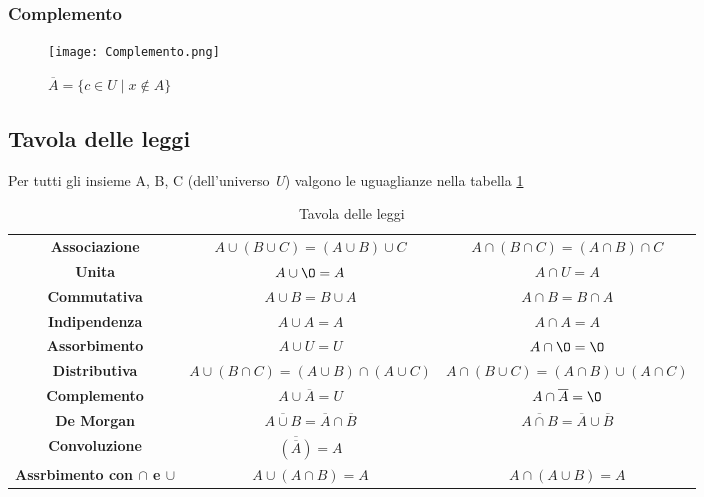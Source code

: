 \subsubsection{Complemento}
\begin{figure}[h!]
    \centering
    \texttt{[image: Complemento.png]}
    \caption{$\overline{A} = \{c \in U \mid x \notin A\}$}
    \label{fig:complemento}
\end{figure}

\subsection{Tavola delle leggi}
Per tutti gli insieme A, B, C (dell'universo \textit{U}) valgono le uguaglianze nella tabella \ref{tab:leggi-insiemi}
\begin{table}[h!]
    \centering
    \setlength{\tabcolsep}{8pt}
    \renewcommand{\arraystretch}{2}
    \begin{tabular}{|c|c c|}
        \hline
        \textbf{Associazione} & $A \cup (B \cup C) = (A \cup B) \cup C$ & $A \cap (B \cap C) = (A \cap B) \cap C$ \\
        \textbf{Unita} & $A \cup \O = A$ & $A \cap U = A$ \\
        \textbf{Commutativa} & $A \cup B = B \cup A$ & $A \cap B = B \cap A$ \\
        \textbf{Indipendenza} & $A \cup A = A$ & $A \cap A = A$ \\
        \textbf{Assorbimento} & $A \cup U = U$ & $A \cap \O = \O$ \\
        \textbf{Distributiva} & $A \cup (B \cap C) = (A \cup B) \cap (A \cup C)$ & $A \cap (B \cup C) = (A \cap B) \cup (A \cap C)$ \\
        \textbf{Complemento} & $A \cup \overline{A} = U$ & $A \cap \overline{A} = \O$ \\
        \textbf{De Morgan} & $\overline{A \cup B} = \overline{A} \cap \overline{B}$ & $\overline{A \cap B} = \overline{A} \cup \overline{B}$ \\
        \textbf{Convoluzione} & $\overline{(\overline{A})} = A$ &  \\
        \textbf{Assrbimento con $\cap$ e $\cup$} & $A \cup (A \cap B) = A$ & $A \cap (A \cup B) = A$ \\
        \hline
    \end{tabular}
    \caption{Tavola delle leggi}
    \label{tab:leggi-insiemi}
\end{table}

\newpage
